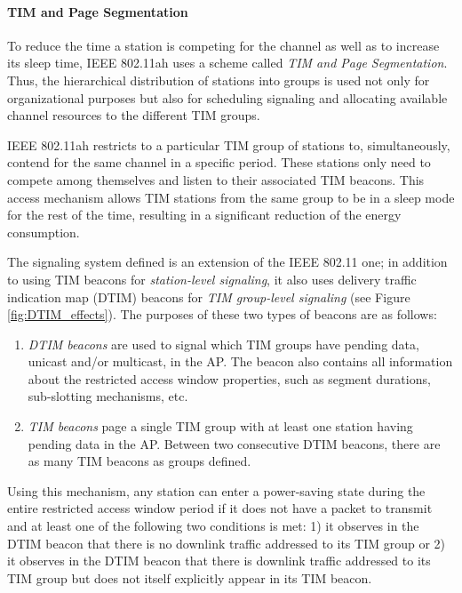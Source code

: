 \documentclass[]{article}
\begin{document}
\paragraph{TIM and Page Segmentation} 

To reduce the time a station is competing for the channel as well as to increase its sleep time, IEEE 802.11ah uses a scheme called \textit{TIM and Page Segmentation}. Thus, the hierarchical distribution of stations into groups is used not only for organizational purposes but also for scheduling signaling and allocating available channel resources to the different TIM groups.

IEEE 802.11ah restricts to a particular TIM group of stations to, simultaneously, contend for the same channel in a specific period. These stations only need to compete among themselves and listen to their associated TIM beacons. This access mechanism allows TIM stations from the same group to be in a sleep mode for the rest of the time, resulting in a significant reduction of the energy consumption.

The signaling system defined is an extension of the IEEE 802.11 one; in addition to using TIM beacons for \textit{station-level signaling}, it also uses delivery traffic indication map (DTIM) beacons for \textit{TIM group-level signaling} (see Figure \ref{fig:DTIM_effects}). The purposes of these two types of beacons are as follows:

\begin{enumerate}
\item \textit{DTIM beacons} are used to signal which TIM groups have pending data, unicast and/or multicast, in the AP. The beacon also contains all information about the restricted access window properties, such as segment durations, sub-slotting mechanisms, etc.
\item \textit{TIM beacons} page a single TIM group with at least one station having pending data in the AP. Between two consecutive DTIM beacons, there are as many TIM beacons as groups defined.
\end{enumerate}

Using this mechanism, any station can enter a power-saving state during the entire restricted access window period if it does not have a packet to transmit and at least one of the following two conditions is met: 1) it observes in the DTIM beacon that there is no downlink traffic addressed to its TIM group or 2) it observes in the DTIM beacon that there is downlink traffic addressed to its TIM group but does not itself explicitly appear in its TIM beacon.
\end{document}
